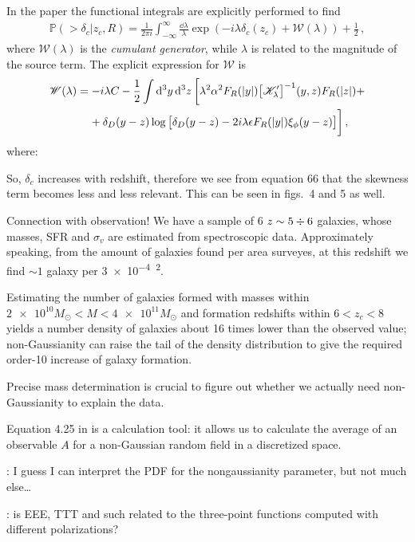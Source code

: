\documentclass[main.tex]{subfiles}
\begin{document}
In the paper the functional integrals are explicitly performed to find 
%
\begin{align}
\mathbb{P}(> \delta _c | z_c, R) = \frac{1}{2 \pi i} \int_{- \infty }^{\infty } \frac{ \dd{\lambda }}{\lambda } \exp( - i \lambda \delta _c (z_c) + \mathscr{W}(\lambda )) + \frac{1}{2}
\,,
\end{align}
%
where \(\mathscr{W}(\lambda )\) is the \emph{cumulant generator}, while \(\lambda \) is related to the magnitude of the source term. The explicit expression for \(\mathscr{W}\) is 
%
\begin{align}
\begin{split}
\mathscr{W}(\lambda ) &=
- i \lambda C - \frac{1}{2} \int \dd[3]{y} \dd[3]{z} 
\bigg[
    \lambda^2 \alpha^2 F_R (\abs{y }) \qty[\mathscr{K}'_\lambda ]^{-1} (y, z)
    F_R(\abs{z}) + \\
    &\phantom{=}\ + \delta _D (y-z) 
    \log \qty[ \delta _D (y-z) - 2i \lambda \epsilon F_R (\abs{y}) \xi _\phi (y-z)]
\bigg]
\,,
\end{split}
\end{align}
%
where: 

So, \(\delta _c\) increases with redshift, therefore we see from equation 66 that the skewness term becomes less and less relevant. 
This can be seen in figs.\ 4 and 5 as well. 

Connection with observation! 
We have a sample of 6 \(z \sim 5 \divisionsymbol 6  \) galaxies, whose masses, SFR and \(\sigma _v\) are estimated from spectroscopic data.
Approximately speaking, from the amount of galaxies found per area surveyes, at this redshift we find \(\sim 1\) galaxy per \SI{3e-4}{\deg^2}. 

Estimating the number of galaxies formed with masses within \(\num{2e10} M_{\odot} < M < \num{4e11}M_{\odot}\) and formation redshifts within \(6 < z_c < 8\) yields a number density of galaxies about 16 times lower than the observed value; non-Gaussianity can raise the tail of the density distribution to give the required order-10 increase of galaxy formation. 

Precise mass determination is crucial to figure out whether we actually need non-Gaussianity to explain the data. 

Equation 4.25 in \textcite[]{verdeMultivariateJointPDF2013} is a calculation tool: it allows us to calculate the average of an observable \(A\) for a non-Gaussian random field in a discretized space. 

\textcite[]{planckcollaborationPlanck2018Results2019}: I guess I can interpret the PDF for the nongaussianity parameter, but not much else\dots

\textcite[]{celoriaPrimordialNonGaussianity2018}: is EEE, TTT and such related to the three-point functions computed with different polarizations?
\end{document}

